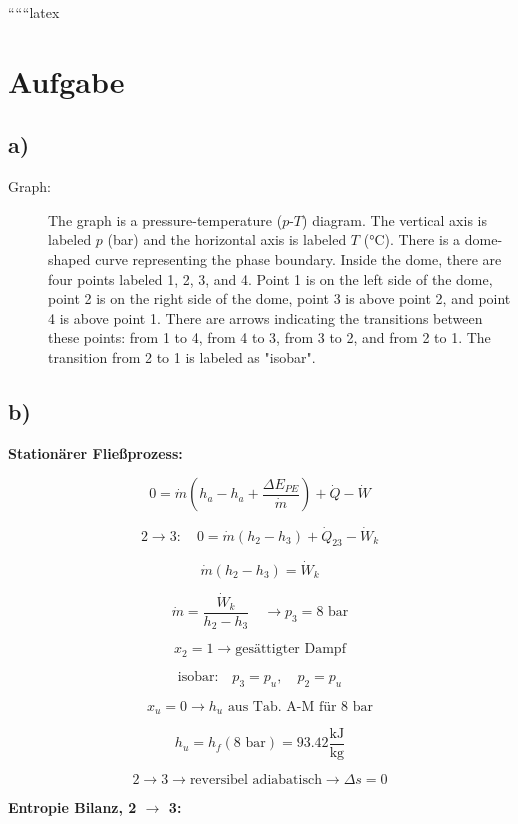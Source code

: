 
``````latex


\section*{Aufgabe}

\subsection*{a)}

\begin{description}
    \item[Graph:] 
    The graph is a pressure-temperature ($p$-$T$) diagram. The vertical axis is labeled $p$ (bar) and the horizontal axis is labeled $T$ (°C). There is a dome-shaped curve representing the phase boundary. Inside the dome, there are four points labeled 1, 2, 3, and 4. Point 1 is on the left side of the dome, point 2 is on the right side of the dome, point 3 is above point 2, and point 4 is above point 1. There are arrows indicating the transitions between these points: from 1 to 4, from 4 to 3, from 3 to 2, and from 2 to 1. The transition from 2 to 1 is labeled as "isobar".
\end{description}

\subsection*{b)}

\textbf{Stationärer Fließprozess:}

\[
0 = \dot{m}(h_{a} - h_{a} + \frac{\Delta E_{PE}}{\dot{m}}) + \dot{Q} - \dot{W}
\]

\[
2 \rightarrow 3: \quad 0 = \dot{m}(h_{2} - h_{3}) + \dot{Q}_{23} - \dot{W}_{k}
\]

\[
\dot{m}(h_{2} - h_{3}) = \dot{W}_{k}
\]

\[
\dot{m} = \frac{\dot{W}_{k}}{h_{2} - h_{3}} \quad \rightarrow p_{3} = 8 \text{ bar}
\]

\[
x_{2} = 1 \rightarrow \text{gesättigter Dampf}
\]

\[
\text{isobar:} \quad p_{3} = p_{u}, \quad p_{2} = p_{u}
\]

\[
x_{u} = 0 \rightarrow h_{u} \text{ aus Tab. A-M für 8 bar}
\]

\[
h_{u} = h_{f}(8 \text{ bar}) = 93.42 \frac{\text{kJ}}{\text{kg}}
\]

\[
2 \rightarrow 3 \rightarrow \text{reversibel adiabatisch} \rightarrow \Delta s = 0
\]

\textbf{Entropie Bilanz, 2 $\rightarrow$ 3:}

